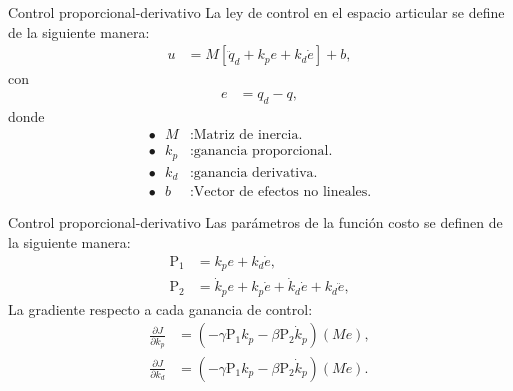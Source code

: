 \documentclass[10pt]{beamer} %
\begin{document}
	\begin{frame}[fragile]{Control proporcional-derivativo}
	La ley de control en el espacio articular se define de la siguiente manera:
	\begin{align*}
		u &= M \left[\ddot{q}_d + k_p e + k_d \dot{e} \right] + b,
	\end{align*}
	con
	\begin{align*}
		e &= q_d - q,
	\end{align*} 
	donde
	\begin{align*}
		\bullet \textrm{ } M&: \textrm{Matriz de inercia.} 			\\
		\bullet \textrm{ } k_p&: \textrm{ganancia proporcional.} 	\\
		\bullet \textrm{ } k_d&: \textrm{ganancia derivativa.} 	\\
		\bullet \textrm{ } b&: \textrm{Vector de efectos no lineales.}							
	\end{align*}		
	\end{frame}

	\begin{frame}[fragile]{Control proporcional-derivativo}
	Las parámetros de la función costo se definen de la siguiente manera:
	\begin{align*}
		\mathrm{P_1}&=  k_p e + k_d \dot{e}, \\
		\mathrm{P_2}&= \dot{k}_p e + k_p \dot{e} +\dot{k}_d\dot{e} + k_d\ddot{e},
	\end{align*}
	La gradiente respecto a cada ganancia de control:
	\begin{align*}
		\frac{\partial J}{\partial k_p} &= (-\gamma\mathrm{P_1}k_p - \beta\mathrm{P_2}\dot{k}_p)(Me), \\
		\frac{\partial J}{\partial k_d} &= (-\gamma\mathrm{P_1}k_p - \beta\mathrm{P_2}\dot{k}_p)(M\dot{e}).
	\end{align*}		
	\end{frame}
\end{document}
